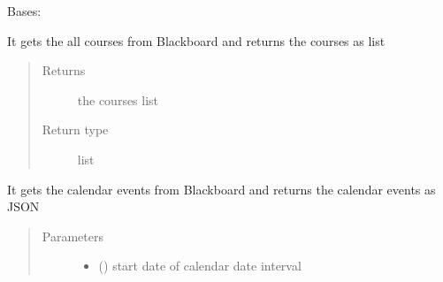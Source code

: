 \documentclass[letterpaper,10pt,english]{sphinxmanual}
\begin{document}
\begin{fulllineitems}
\label{\detokenize{BlackBoardAPI:BlackBoardAPI.BlackBoardAPI}}
\pysigstartsignatures
{}
\pysigstopsignatures
\sphinxAtStartPar
Bases: 

\begin{fulllineitems}
\label{\detokenize{BlackBoardAPI:BlackBoardAPI.BlackBoardAPI.getAllCourses}}
\pysigstartsignatures
{}
\pysigstopsignatures
\sphinxAtStartPar
It gets the all courses from Blackboard and returns the courses as list
\begin{quote}\begin{description}
\item[{Returns}] \leavevmode
\sphinxAtStartPar
the courses list

\item[{Return type}] \leavevmode
\sphinxAtStartPar
list

\end{description}\end{quote}

\end{fulllineitems}


\begin{fulllineitems}
\label{\detokenize{BlackBoardAPI:BlackBoardAPI.BlackBoardAPI.getCalendarEvents}}
\pysigstartsignatures
{}
\pysigstopsignatures
\sphinxAtStartPar
It gets the calendar events from Blackboard and returns the calendar events as JSON
\begin{quote}\begin{description}
\item[{Parameters}] \leavevmode\begin{itemize}
\item {} 
\sphinxAtStartPar
{} () \textendash{} start date of calendar date interval


\end{itemize}
\end{description}
\end{quote}
\end{fulllineitems}
\end{fulllineitems}
\end{document}
